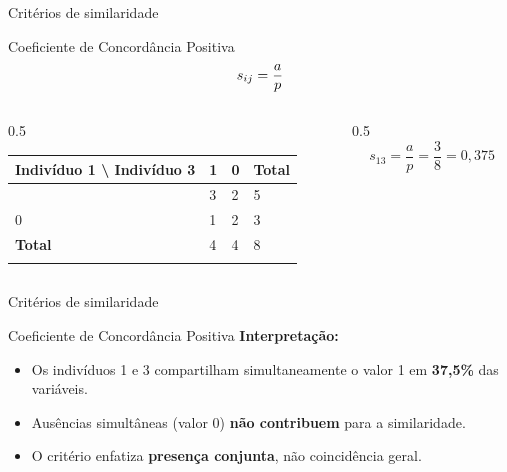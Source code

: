 \documentclass[
  ignorenonframetext,
  aspectratio=169,
]{beamer}
\providecommand{\tightlist}{%
  \setlength{\itemsep}{0pt}\setlength{\parskip}{0pt}}
\begin{document}
\begin{frame}{Critérios de similaridade}
\label{crituxe9rios-de-similaridade-2}
\begin{block}{Coeficiente de Concordância Positiva}
\label{coeficiente-de-concorduxe2ncia-positiva}
\[\Large s_{ij} = \displaystyle{\frac{a}{p}}\]

\begin{columns}[T]
\begin{column}{0.5\linewidth}
\begin{longtable}[]{@{}llll@{}}
\toprule\noalign{}
Indivíduo 1 \textbackslash{} Indivíduo 3 & 1 & 0 & Total \\
\midrule\noalign{}
\endhead
1 & 3 & 2 & 5 \\
0 & 1 & 2 & 3 \\
\textbf{Total} & 4 & 4 & 8 \\
\bottomrule\noalign{}
\end{longtable}
\end{column}

\begin{column}{0.5\linewidth}
\[
s_{13} = \dfrac{a}{p}= 
               \dfrac{3}{8} = 0,375
\]
\end{column}
\end{columns}
\end{block}
\end{frame}

\begin{frame}{Critérios de similaridade}
\label{crituxe9rios-de-similaridade-3}
\begin{block}{Coeficiente de Concordância Positiva}
\label{coeficiente-de-concorduxe2ncia-positiva-1}
\textbf{Interpretação:}

\begin{itemize}
\tightlist
\item
  Os indivíduos 1 e 3 compartilham simultaneamente o valor 1 em
  \textbf{37,5\%} das variáveis.
\item
  Ausências simultâneas (valor 0) \textbf{não contribuem} para a
  similaridade.
\item
  O critério enfatiza \textbf{presença conjunta}, não coincidência
  geral.
\end{itemize}
\end{block}
\end{frame}
\end{document}
